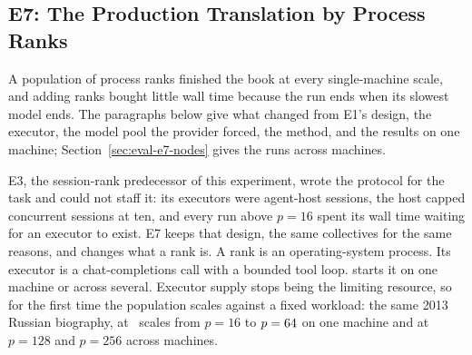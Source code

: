 
\subsection{E7: The Production Translation by Process Ranks}
\label{sec:eval-e7}

A population of process ranks finished the book at every single-machine scale,
and adding ranks bought little wall time because the run ends when its slowest
model ends. The paragraphs below give what changed from E1's design, the
executor, the model pool the provider forced, the method, and the results on
one machine; Section~\ref{sec:eval-e7-nodes} gives the runs across machines.

E3, the session-rank predecessor of this experiment, wrote the protocol for the
task and could not staff it: its executors were agent-host sessions, the host
capped concurrent sessions at ten, and every run above $p=16$ spent its wall
time waiting for an executor to exist. E7 keeps that design, the same
collectives for the same reasons, and changes what a rank is. A rank is an
operating-system process. Its executor is a chat-completions call with a bounded
tool loop.  starts it on one machine or across several. Executor
supply stops being the limiting resource, so for the first time the population
scales against a fixed workload: the same 2013 Russian biography, at
\eSevenScales\ scales from $p=16$ to $p=64$ on one machine and at
$p=128$ and $p=256$ across machines.

